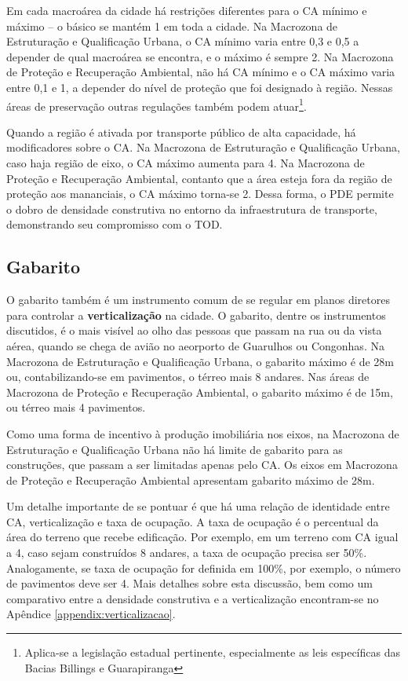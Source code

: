 Em cada macroárea da cidade há restrições diferentes para o CA mínimo e máximo -- o básico se mantém 1 em toda a cidade. Na Macrozona de Estruturação e Qualificação Urbana, o CA mínimo varia entre 0,3 e 0,5 a depender de qual macroárea se encontra, e o máximo é sempre 2. Na Macrozona de Proteção e Recuperação Ambiental, não há CA mínimo e o CA máximo varia entre 0,1 e 1, a depender do nível de proteção que foi designado à região. Nessas áreas de preservação outras regulações também podem atuar\footnote{Aplica-se a legislação estadual pertinente, especialmente as leis específicas das Bacias Billings e Guarapiranga}.

Quando a região é ativada por transporte público de alta capacidade, há modificadores sobre o CA. Na Macrozona de Estruturação e Qualificação Urbana, caso haja região de eixo, o CA máximo aumenta para 4. Na Macrozona de Proteção e Recuperação Ambiental, contanto que a área esteja fora da região de proteção aos mananciais, o CA máximo torna-se 2. Dessa forma, o PDE permite o dobro de densidade construtiva no entorno da infraestrutura de transporte, demonstrando seu compromisso com o TOD.

\subsection*{Gabarito}

O gabarito também é um instrumento comum de se regular em planos diretores para controlar a \textbf{verticalização} na cidade. O gabarito, dentre os instrumentos discutidos, é o mais visível ao olho das pessoas que passam na rua ou da vista aérea, quando se chega de avião no aeorporto de Guarulhos ou Congonhas. Na Macrozona de Estruturação e Qualificação Urbana, o gabarito máximo é de 28m ou, contabilizando-se em pavimentos, o térreo mais 8 andares. Nas áreas de Macrozona de Proteção e Recuperação Ambiental, o gabarito máximo é de 15m, ou térreo mais 4 pavimentos.

Como uma forma de incentivo à produção imobiliária nos eixos, na Macrozona de Estruturação e Qualificação Urbana não há limite de gabarito para as construções, que passam a ser limitadas apenas pelo CA. Os eixos em Macrozona de Proteção e Recuperação Ambiental apresentam gabarito máximo de 28m.

Um detalhe importante de se pontuar é que há uma relação de identidade entre CA, verticalização e taxa de ocupação. A taxa de ocupação é o percentual da área do terreno que recebe edificação. Por exemplo, em um terreno com CA igual a 4, caso sejam construídos 8 andares, a taxa de ocupação precisa ser 50\%. Analogamente, se taxa de ocupação for definida em 100\%, por exemplo, o número de pavimentos deve ser 4. Mais detalhes sobre esta discussão, bem como um comparativo entre a densidade construtiva e a verticalização encontram-se no Apêndice \ref{appendix:verticalizacao}.

